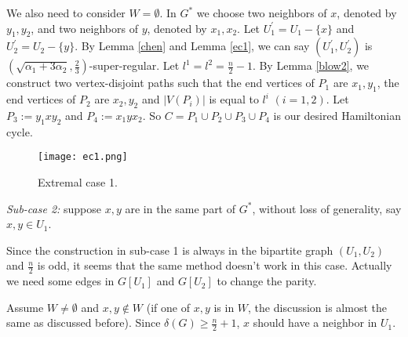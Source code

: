 \documentclass[11pt]{article}
\begin{document}
We also need to consider $W=\emptyset$. In $G^*$ we choose two neighbors of $x$, denoted by $y_1,y_2$, and two neighbors of $y$, denoted by $x_1,x_2$. Let $U_1^{'}=U_1-\{x\}$ and $U_2^{'}=U_2-\{y\}$. By Lemma \ref{chen} and Lemma \ref{ec1}, we can say $(U_1^{'},U_2^{'})$ is $(\sqrt{\alpha_1+3\alpha_2},\frac{2}{3})$-super-regular. Let $l^1=l^2=\frac{n}{2}-1$. By Lemma \ref{blow2}, we construct two vertex-disjoint paths such that the end vertices of $P_1$ are $x_1, y_1$, the end vertices of $P_2$ are $x_2, y_2$ and $|V(P_i)|$ is equal to $l^i$ $(i=1,2)$. Let $P_3:=y_1xy_2$ and $P_4:=x_1yx_2$. So $C=P_1\cup P_2\cup P_3\cup P_4$ is our desired Hamiltonian cycle.



\begin{figure}[htbp]
\centering
\texttt{[image: ec1.png]}
\caption{Extremal case 1.}
\end{figure}

\noindent
{\em Sub-case 2:} suppose $x,y$ are in the same part of $G^*$, without loss of generality, say $x,y\in U_1$.

Since the construction in sub-case 1 is always in the bipartite graph $(U_1,U_2)$ and $\frac{n}{2}$ is odd, it seems that the same method doesn't work in this case. Actually we need some edges in $G[U_1]$ and $G[U_2]$ to change the parity.

Assume $W\not =\emptyset$ and $x,y\not \in W$ (if one of $x,y$ is in $W$, the discussion is almost the same as discussed before). Since $\delta (G)\geq \frac{n}{2}+1$, $x$ should have a neighbor in $U_1$.
\end{document}

